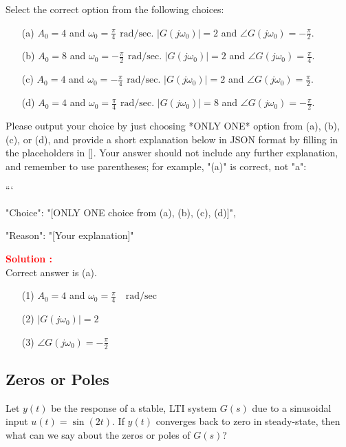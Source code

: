 \documentclass[12pt]{article}
\begin{document}
Select the correct option from the following choices:
\begin{enumerate}
    \item [(a)] \(A_0 = 4\) and \(\omega_0 = \frac{\pi}{4} \,\ \text{rad/sec}\). \(|G(j\omega_0)| = 2\)  and \(\angle G(j\omega_0) = -\frac{\pi}{2}\).
    \item [(b)] \(A_0 = 8\) and \(\omega_0 = -\frac{\pi}{2} \,\ \text{rad/sec}\). \(|G(j\omega_0)| = 2\)  and \(\angle G(j\omega_0) = \frac{\pi}{4}\).
    \item [(c)] \(A_0 = 4\) and \(\omega_0 = -\frac{\pi}{4} \,\ \text{rad/sec}\). \(|G(j\omega_0)| = 2\)  and \(\angle G(j\omega_0) = \frac{\pi}{2}\).
    \item [(d)] \(A_0 = 4\) and \(\omega_0 = \frac{\pi}{4} \,\ \text{rad/sec}\). \(|G(j\omega_0)| = 8\)  and \(\angle G(j\omega_0) = -\frac{\pi}{2}\).
\end{enumerate}


Please output your choice by just choosing *ONLY ONE* option from (a), (b), (c), or (d), and provide a short explanation below in JSON format by filling in the placeholders in []. Your answer should not include any further explanation, and remember to use parentheses; for example, "(a)" is correct, not "a": 

```
{

"Choice": "[ONLY ONE choice from (a), (b), (c), (d)]",

"Reason": "[Your explanation]"

}


\textbf{\textcolor{red}{Solution :}}\\
Correct answer is (a).\\
\begin{itemize}
    \item[(1)] \(A_0 = 4\) and \(\omega_0 = \frac{\pi}{4} \quad \text{rad/sec}\)
    \item[(2)] \(|G(j\omega_0)| = 2\) 
    \item[(3)] \(\angle G(j\omega_0) = -\frac{\pi}{2}\)
\end{itemize}
\clearpage

\subsection{Zeros or Poles}

Let \(y(t)\) be the response of a stable, LTI system \(G(s)\) due to a sinusoidal input \(u(t) = \sin(2t)\). If \(y(t)\) converges back to zero in steady-state, then what can we say about the zeros or poles of \(G(s)\)?
\end{document}
